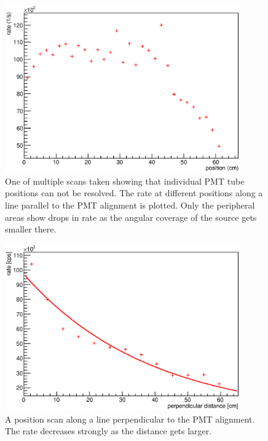    \begin{figure}
  	\centering 
  	\includegraphics[width = 0.9\textwidth]{graphics/cobaltRate/6parallel.eps}
  	\caption[Cobalt parallel scan]{One of multiple scans taken showing that individual PMT tube positions can not be resolved. The rate at different positions along a line parallel to the PMT alignment is plotted. Only the peripheral areas show drops in rate as the angular coverage of the source gets smaller there.}
  	\label{fig:parallelScan}
  \end{figure}
  
	\begin{figure}
  	\centering 
  	\includegraphics[width = 0.9\textwidth]{graphics/cobaltRate/6perpendicularScan.eps}
  	\caption[Cobalt perpendicular scan]{A position scan along a line perpendicular to the PMT alignment. The rate decreases strongly as the distance gets larger.}
  	\label{fig:perpendicularScan}
  \end{figure}


